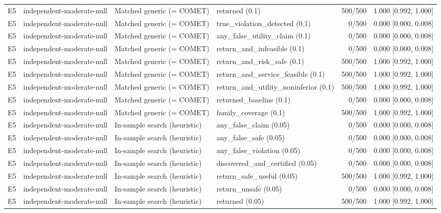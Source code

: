 \begin{longtable}{p{.04\linewidth}p{.18\linewidth}p{.19\linewidth}p{.16\linewidth}r p{.21\linewidth}}
E5 & independent-moderate-null & Matched generic (= COMET) & returned (0.1) & 500/500 & 1.000 [0.992, 1.000]\\
E5 & independent-moderate-null & Matched generic (= COMET) & true\_violation\_detected (0.1) & 0/500 & 0.000 [0.000, 0.008]\\
E5 & independent-moderate-null & Matched generic (= COMET) & any\_false\_utility\_claim (0.1) & 0/500 & 0.000 [0.000, 0.008]\\
E5 & independent-moderate-null & Matched generic (= COMET) & return\_and\_infeasible (0.1) & 0/500 & 0.000 [0.000, 0.008]\\
E5 & independent-moderate-null & Matched generic (= COMET) & return\_and\_risk\_safe (0.1) & 500/500 & 1.000 [0.992, 1.000]\\
E5 & independent-moderate-null & Matched generic (= COMET) & return\_and\_service\_feasible (0.1) & 500/500 & 1.000 [0.992, 1.000]\\
E5 & independent-moderate-null & Matched generic (= COMET) & return\_and\_utility\_noninferior (0.1) & 500/500 & 1.000 [0.992, 1.000]\\
E5 & independent-moderate-null & Matched generic (= COMET) & returned\_baseline (0.1) & 0/500 & 0.000 [0.000, 0.008]\\
E5 & independent-moderate-null & Matched generic (= COMET) & family\_coverage (0.1) & 500/500 & 1.000 [0.992, 1.000]\\
E5 & independent-moderate-null & In-sample search (heuristic) & any\_false\_claim (0.05) & 0/500 & 0.000 [0.000, 0.008]\\
E5 & independent-moderate-null & In-sample search (heuristic) & any\_false\_safe (0.05) & 0/500 & 0.000 [0.000, 0.008]\\
E5 & independent-moderate-null & In-sample search (heuristic) & any\_false\_violation (0.05) & 0/500 & 0.000 [0.000, 0.008]\\
E5 & independent-moderate-null & In-sample search (heuristic) & discovered\_and\_certified (0.05) & 0/500 & 0.000 [0.000, 0.008]\\
E5 & independent-moderate-null & In-sample search (heuristic) & return\_safe\_useful (0.05) & 500/500 & 1.000 [0.992, 1.000]\\
E5 & independent-moderate-null & In-sample search (heuristic) & return\_unsafe (0.05) & 0/500 & 0.000 [0.000, 0.008]\\
E5 & independent-moderate-null & In-sample search (heuristic) & returned (0.05) & 500/500 & 1.000 [0.992, 1.000]\\

\end{longtable}
